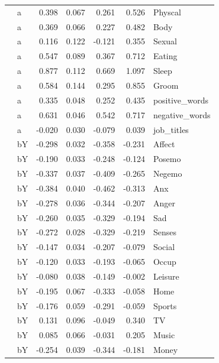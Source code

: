 \documentclass[11pt,a4paper]{article}
\begin{document}
\begin{longtable}{llrrrrl}
   & a &  0.398 &  0.067 &    0.261 &     0.526 &         Physcal \\
   & a &  0.369 &  0.066 &    0.227 &     0.482 &            Body \\
   & a &  0.116 &  0.122 &   -0.121 &     0.355 &          Sexual \\
   & a &  0.547 &  0.089 &    0.367 &     0.712 &          Eating \\
   & a &  0.877 &  0.112 &    0.669 &     1.097 &           Sleep \\
   & a &  0.584 &  0.144 &    0.295 &     0.855 &           Groom \\
   & a &  0.335 &  0.048 &    0.252 &     0.435 &  positive\_words \\
   & a &  0.631 &  0.046 &    0.542 &     0.717 &  negative\_words \\
   & a & -0.020 &  0.030 &   -0.079 &     0.039 &      job\_titles \\
   & bY & -0.298 &  0.032 &   -0.358 &    -0.231 &          Affect \\
   & bY & -0.190 &  0.033 &   -0.248 &    -0.124 &          Posemo \\
   & bY & -0.337 &  0.037 &   -0.409 &    -0.265 &          Negemo \\
   & bY & -0.384 &  0.040 &   -0.462 &    -0.313 &             Anx \\
   & bY & -0.278 &  0.036 &   -0.344 &    -0.207 &           Anger \\
   & bY & -0.260 &  0.035 &   -0.329 &    -0.194 &             Sad \\
   & bY & -0.272 &  0.028 &   -0.329 &    -0.219 &          Senses \\
   & bY & -0.147 &  0.034 &   -0.207 &    -0.079 &          Social \\
   & bY & -0.120 &  0.033 &   -0.193 &    -0.065 &           Occup \\
   & bY & -0.080 &  0.038 &   -0.149 &    -0.002 &         Leisure \\
   & bY & -0.195 &  0.067 &   -0.333 &    -0.058 &            Home \\
   & bY & -0.176 &  0.059 &   -0.291 &    -0.059 &          Sports \\
   & bY &  0.131 &  0.096 &   -0.049 &     0.340 &              TV \\
   & bY &  0.085 &  0.066 &   -0.031 &     0.205 &           Music \\
   & bY & -0.254 &  0.039 &   -0.344 &    -0.181 &           Money \\

\end{longtable}
\end{document}
